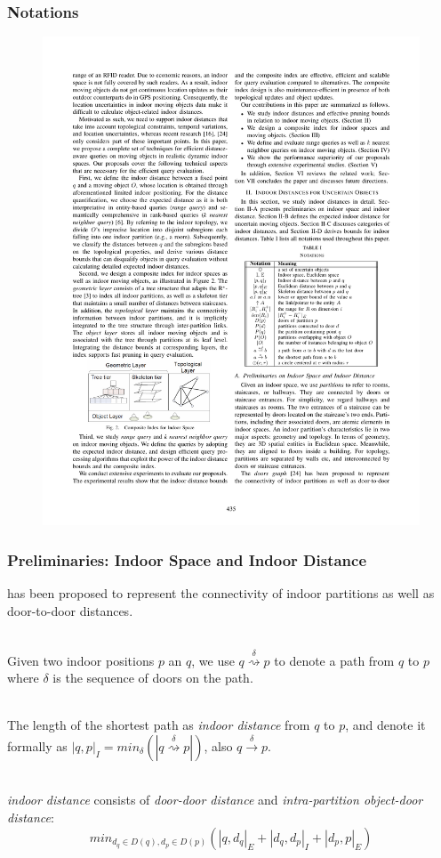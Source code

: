 \begin{frame}
\frametitle{Notations}

\begin{figure}[tb]
  \includegraphics[width=0.75\columnwidth]{figures/2-6/2-6-1.pdf}
\end{figure}

\end{frame}


\begin{frame}
\frametitle{Preliminaries: Indoor Space and Indoor Distance}

 has been proposed to represent the connectivity of indoor partitions as well as door-to-door distances.~\cite{DBLP:conf/edbt/YangLJ10}\\~\\\pause

Given two indoor positions $p$ an $q$, we use $q \overset{\delta}{\rightsquigarrow} p$ to denote a path from $q$ to $p$ where $\delta$ is the sequence of doors on the path.\\~\\\pause

The length of the shortest path as \emph{indoor distance} from $q$ to $p$, and denote it formally as $|q, p|_{I} = min_{\delta}(|q \overset{\delta}{\rightsquigarrow} p|)$, also $q \overset{\delta}{\rightarrow} p$.\\~\\\pause

\emph{indoor distance} consists of \emph{door-door distance} and \emph{intra-partition object-door distance}:\pause
\begin{equation}
  min_{d_q \in D(q), d_p \in D(p)}(|q, d_q|_{E} + |d_q, d_p|_{I} + |d_p, p|_{E})
\end{equation}

\end{frame}

